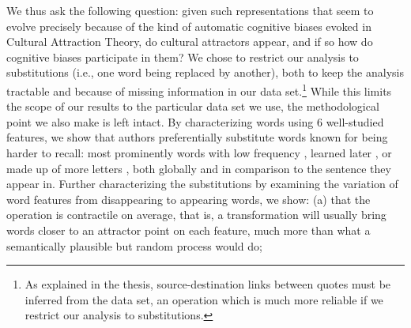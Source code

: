 \documentclass[english,]{article}
\begin{document}
We thus ask the following question: given such representations that seem to evolve precisely because of the kind of automatic cognitive biases evoked in Cultural Attraction Theory, do cultural attractors appear, and if so how do cognitive biases participate in them?
We chose to restrict our analysis to substitutions (i.e., one word being replaced by another), both to keep the analysis tractable and because of missing information in our data set.\footnote{
As explained in the thesis, source-destination links between quotes must be inferred from the data set, an operation which is much more reliable if we restrict our analysis to substitutions.
}
While this limits the scope of our results to the particular data set we use, the methodological point we also make is left intact.
By characterizing words using 6 well-studied features, we show that authors preferentially substitute words known for being harder to recall:
most prominently words with low frequency \autocite{gregg_word_1976}, learned later \autocite{dewhurst_separate_1998}, or made up of more letters \autocite{nickels_dissociating_2004}, both globally and in comparison to the sentence they appear in.
Further characterizing the substitutions by examining the variation of word features from disappearing to appearing words, we show:
(a) that the operation is contractile on average, that is, a transformation will usually bring words closer to an attractor point on each feature, much more than what a semantically plausible but random process would do;
\end{document}
